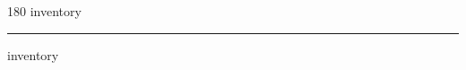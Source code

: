 
\begin{frame}
\begin{center}
\begin{turn}{180}
{\fontsize{2.5cm}{1em}\selectfont inventory}
\end{turn}
\vspace{1em}\par  
\hrule
\vspace{1em}\par  
{\fontsize{2.5cm}{1em}\selectfont inventory}
\end{center}
\end{frame}
